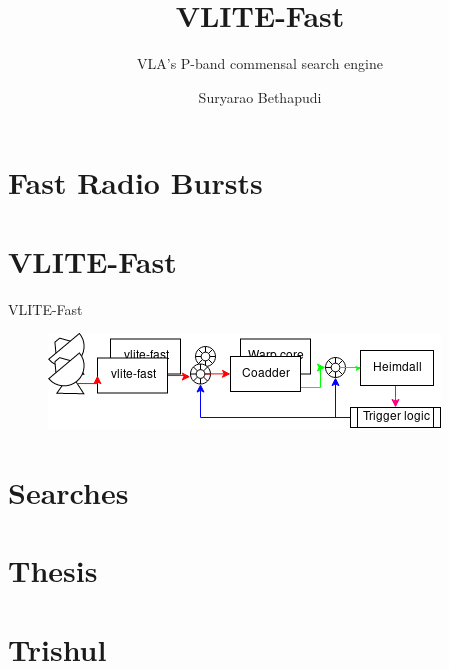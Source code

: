 \documentclass{beamer}
\title{VLITE-Fast} %
\subtitle{VLA's P-band commensal search engine} %
\author{Suryarao Bethapudi}
\begin{document}
\frame{\maketitle}



\section{Fast Radio Bursts}


\section{VLITE-Fast}
\begin{frame}{VLITE-Fast}
\begin{figure}
	\includegraphics[width=\textwidth,keepaspectratio]{vf_full.png}
\end{figure}
\end{frame}


\section{Searches}


\section{Thesis}


\section{Trishul}

\end{document}
